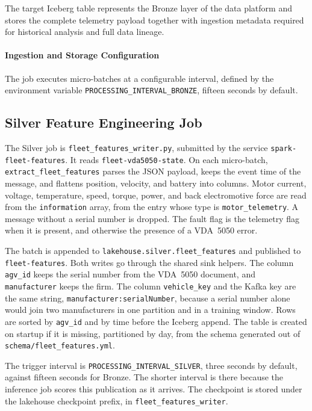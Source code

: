 The target Iceberg table represents the Bronze layer of the data platform and stores the complete telemetry payload together with ingestion metadata required for historical analysis and full data lineage.
\paragraph{Ingestion and Storage Configuration} 
The job executes micro-batches at a configurable interval, defined by the environment variable \texttt{PROCESSING\_INTERVAL\_BRONZE}, fifteen seconds by default.
\subsection{Silver Feature Engineering Job}
\label{subsec:silver-feature-engineering-job}

The Silver job is \texttt{fleet\_features\_writer.py}, submitted by the service \texttt{spark-fleet-features}. It reads \texttt{fleet-vda5050-state}. On each micro-batch, \texttt{extract\_fleet\_features} parses the JSON payload, keeps the event time of the message, and flattens position, velocity, and battery into columns. Motor current, voltage, temperature, speed, torque, power, and back electromotive force are read from the \texttt{information} array, from the entry whose type is \texttt{motor\_telemetry}. A message without a serial number is dropped. The fault flag is the telemetry flag when it is present, and otherwise the presence of a VDA~5050 error.

The batch is appended to \texttt{lakehouse.silver.fleet\_features} and published to \texttt{fleet-features}. Both writes go through the shared sink helpers. The column \texttt{agv\_id} keeps the serial number from the VDA~5050 document, and \texttt{manufacturer} keeps the firm. The column \texttt{vehicle\_key} and the Kafka key are the same string, \texttt{manufacturer:serialNumber}, because a serial number alone would join two manufacturers in one partition and in a training window. Rows are sorted by \texttt{agv\_id} and by time before the Iceberg append. The table is created on startup if it is missing, partitioned by day, from the schema generated out of \texttt{schema/fleet\_features.yml}.

The trigger interval is \texttt{PROCESSING\_INTERVAL\_SILVER}, three seconds by default, against fifteen seconds for Bronze. The shorter interval is there because the inference job scores this publication as it arrives. The checkpoint is stored under the lakehouse checkpoint prefix, in \texttt{fleet\_features\_writer}.

